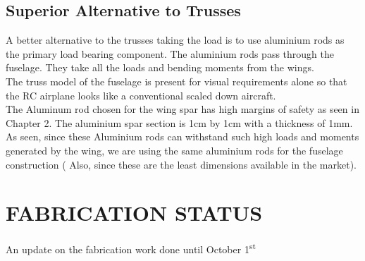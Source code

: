 \subsection{Superior Alternative to Trusses}
A better alternative to the trusses taking the load is to use aluminium rods as the primary load bearing component. The aluminium rods pass through the fuselage. They take all the loads and bending moments from the wings. 
\\
The truss model of the fuselage is present for visual requirements alone so that the RC airplane looks like a conventional scaled down aircraft. 
\\
The Aluminum rod chosen for the wing spar has high margins of safety as seen in Chapter 2. The aluminium spar section is 1cm by 1cm with a thickness of 1mm. As seen, since these Aluminium rods can withstand such high loads and moments generated by the wing, we are using the same aluminium rods for the fuselage construction ( Also, since these are the least dimensions available in the market).

\section{FABRICATION STATUS}
\label{s:ch3_fabricationtillnow}
An update on the fabrication work done until October 1\textsuperscript{st}

\begin{table}[H]
\centering
{}
\caption{Fabrication work done until October 1\textsuperscript{st}}
\label{tab:ch3_fabtillnow}
\end{table}
%
%
%
